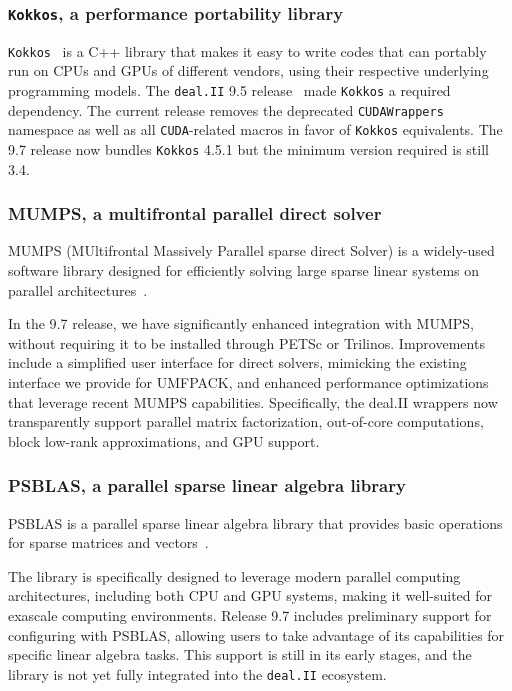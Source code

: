 \documentclass{ansarticle-preprint}
\newcommand{\specialword}[1]{\texttt{#1}}
\newcommand{\dealii}{{\specialword{deal.II}}\xspace}
\newcommand{\kokkos}{{\specialword{Kokkos}}\xspace}
\begin{document}


\subsubsection{\kokkos, a performance portability library}
\label{subsec:external-kokkos}

\kokkos~\cite{trott2022} is a C++ library that makes it easy to write codes that can
portably run on CPUs and GPUs of different vendors, using their
respective underlying programming models.
The \dealii{} 9.5 release~\cite{dealII95} made \kokkos a required
dependency. The current release removes the deprecated \texttt{CUDAWrappers} namespace as well
as all \texttt{CUDA}-related macros in favor of \kokkos
equivalents. The 9.7 release now bundles \kokkos 4.5.1 but the minimum version required is still 3.4.

\subsubsection{MUMPS, a multifrontal parallel direct solver}

MUMPS (MUltifrontal Massively Parallel sparse direct Solver) is a
widely-used software library designed for efficiently solving large sparse linear systems on parallel architectures~\cite{amestoy2001mumps}.

In the 9.7 release, we have significantly enhanced integration with MUMPS,
without requiring it to be installed through PETSc or Trilinos. Improvements
include a simplified user interface for direct solvers, mimicking the existing
interface we provide for UMFPACK, and enhanced performance optimizations that
leverage recent MUMPS capabilities. Specifically, the deal.II wrappers now
transparently support parallel matrix factorization, out-of-core computations,
block low-rank approximations, and GPU support.

\subsubsection{PSBLAS, a parallel sparse linear algebra library}

PSBLAS is a parallel sparse linear algebra library that provides basic operations for sparse matrices and vectors~\cite{Filippone2000psblas}.

The library is specifically designed to leverage modern
parallel computing architectures, including both CPU and GPU systems, making it well-suited for exascale
computing environments. Release 9.7 includes preliminary support for configuring with PSBLAS, allowing users to take advantage of its capabilities for specific linear algebra tasks. This support is still in its early stages, and the library is not yet fully integrated into the \dealii{} ecosystem.
\end{document}
